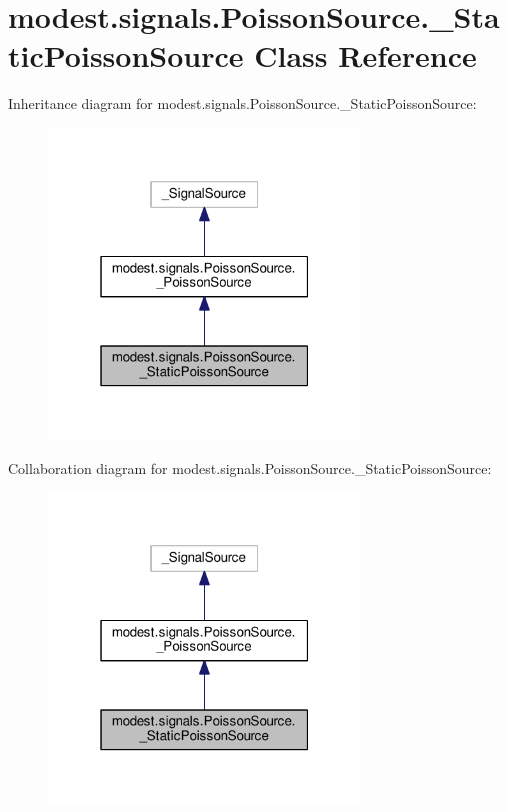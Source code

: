 \hypertarget{classmodest_1_1signals_1_1PoissonSource_1_1__StaticPoissonSource}{}\section{modest.\+signals.\+Poisson\+Source.\+\_\+\+Static\+Poisson\+Source Class Reference}
\label{classmodest_1_1signals_1_1PoissonSource_1_1__StaticPoissonSource}


Inheritance diagram for modest.\+signals.\+Poisson\+Source.\+\_\+\+Static\+Poisson\+Source\+:
\nopagebreak
\begin{figure}[H]
\begin{center}
\leavevmode
\includegraphics[width=235pt]{classmodest_1_1signals_1_1PoissonSource_1_1__StaticPoissonSource__inherit__graph}
\end{center}
\end{figure}


Collaboration diagram for modest.\+signals.\+Poisson\+Source.\+\_\+\+Static\+Poisson\+Source\+:
\nopagebreak
\begin{figure}[H]
\begin{center}
\leavevmode
\includegraphics[width=235pt]{classmodest_1_1signals_1_1PoissonSource_1_1__StaticPoissonSource__coll__graph}
\end{center}
\end{figure}
